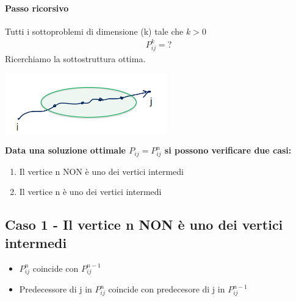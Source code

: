 \paragraph*{Passo ricorsivo} Tutti i sottoproblemi di dimensione (k) tale che $k > 0$
\begin{align*}
    P^k_{ij} = ?
\end{align*}
Ricerchiamo la sottostruttura ottima.\\
\begin{center}
    \includegraphics[width=70mm, scale=0.5]{chapters_ulerich/img/floyd_warshall_tent_sottostruttura_3.png}
\end{center}
\textbf{Data una soluzione ottimale $P_{ij}=P^n_{ij}$ si possono verificare due casi:}
\begin{enumerate}
    \item Il vertice n NON è uno dei vertici intermedi
    \item Il vertice n è uno dei vertici intermedi
\end{enumerate}
\subsection*{Caso 1 - Il vertice n NON è uno dei vertici intermedi}
\begin{itemize}
    \item $P^n_{ij}$ coincide con $P^{n-1}_{ij}$
    \item Predecessore di j in $P^n_{ij}$ coincide con predecesore di j in $P^{n-1}_{ij}$
\end{itemize}
